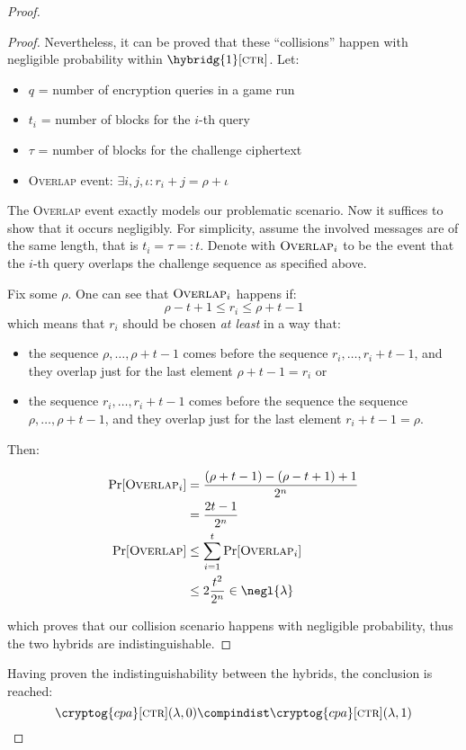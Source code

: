 \begin{proof}
\begin{proof}
        Nevertheless, it can be proved that these ``collisions'' happen with negligible probability within $\hybridg{1}[\textsc{ctr}]$. Let:
        \begin{itemize}
            \item $q$ = number of encryption queries in a game run
            \item $t_i$ = number of blocks for the $i$-th query
            \item $\tau$ = number of blocks for the challenge ciphertext
            \item \textsc{Overlap} event: $\exists i, j, \iota : r_i + j = \rho + \iota$
        \end{itemize}

        The \textsc{Overlap} event exactly models our problematic scenario. Now it suffices to show that it occurs negligibly. For simplicity, assume the involved messages are of the same length, that is $t_i = \tau =: t$. Denote with $\textsc{Overlap}_i$ to be the event that the $i$-th query overlaps the challenge sequence as specified above.

        Fix some $\rho$. One can see that $\textsc{Overlap}_i$ happens if:
        \[
            \rho - t + 1 \leq r_i \leq \rho + t - 1
        \]
        which means that $r_i$ should be chosen \emph{at least} in a way that:
        \begin{itemize}
            \item the sequence $\rho, \dots, \rho + t - 1$ comes before the sequence $r_i, \dots, r_i + t - 1$, and they overlap just for the last element $\rho + t - 1 = r_i$ or
            \item the sequence $r_i, \dots, r_i + t - 1$ comes before the sequence the sequence $\rho, \dots, \rho + t - 1$, and they overlap just for the last element $r_i + t - 1 = \rho$.
        \end{itemize}

        Then:

        \begin{align*}
            \Pr[\textsc{Overlap}_i] &= \frac{(\rho + t - 1) - (\rho - t + 1) + 1}{2^n} \\
            &= \frac{2t-1}{2^n} \\
            \Pr[\textsc{Overlap}] &\leq \sum_{i = 1}^{t} \Pr[\textsc{Overlap}_i] \\
            &\leq 2 \frac{t^2}{2^n} \in \negl{\lambda} 
        \end{align*}
            
        which proves that our collision scenario happens with negligible probability, thus the two hybrids are indistinguishable.

    \end{proof}
    
    Having proven the indistinguishability between the hybrids, the conclusion is reached:
    \[
        \cryptog{cpa}[\textsc{ctr}](\lambda, 0) \compindist \cryptog{cpa}[\textsc{ctr}](\lambda, 1)
    \]
    
\end{proof}
